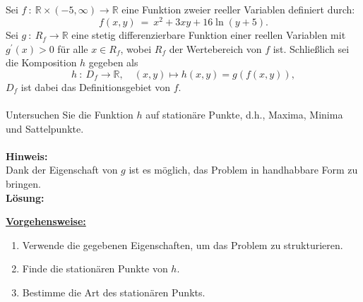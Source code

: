 \newpage

\subsection*{}
Sei $f \ : \ \mathbb{R} \times (-5, \infty) \to \mathbb{R}$ eine Funktion zweier reeller Variablen definiert durch:
\begin{equation*}
f(x,y)\ = \ x^2 + 3 x y + 16 \ln(y+5).
\end{equation*}
Sei $g \ : \ R_f \to \mathbb{R}$ eine stetig differenzierbare Funktion einer reellen Variablen mit $g^\prime(x) > 0$
für alle $x \in R_f$, wobei $R_f$ der Wertebereich von $f$ ist.
Schließlich sei die Komposition $h$ gegeben als
\begin{equation*}
h \ : \ D_f \to \mathbb{R}, \quad (x,y) \mapsto h(x,y) = g(f(x,y)),
\end{equation*}
$D_f$ ist dabei das Definitionsgebiet von $f$.
\\
\\
Untersuchen Sie die Funktion $h$ auf stationäre Punkte, d.h., Maxima, Minima und Sattelpunkte.
\\
\\
\textbf{Hinweis:} \\
Dank der Eigenschaft von $g$ ist es möglich, das Problem in handhabbare Form zu bringen.\\

\textbf{Lösung:}
\begin{mdframed}
\underline{\textbf{Vorgehensweise:}}
\renewcommand{\labelenumi}{\theenumi.}
\begin{enumerate}
\item Verwende die gegebenen Eigenschaften, um das Problem zu strukturieren.
\item Finde die stationären Punkte von $h$.
\item Bestimme die Art des stationären Punkts.
\end{enumerate}
\end{mdframed}

